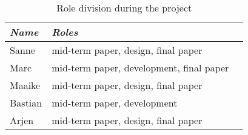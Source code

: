 \begin{table}[!ht]
\centering
\begin{tabular}{ l l p{0cm} }
\hline
\emph{Name} & \emph{Roles} \\
\hline
Sanne & mid-term paper, design, final paper  \\ \hline
Marc & mid-term paper, development, final paper  \\ \hline
Maaike & mid-term paper, design, final paper  \\ \hline
Bastian & mid-term paper, development   \\ \hline
Arjen & mid-term paper, design, final paper \\ \hline
\end{tabular}
\caption{Role division during the project} \label{tbl:role-division}
\end{table}